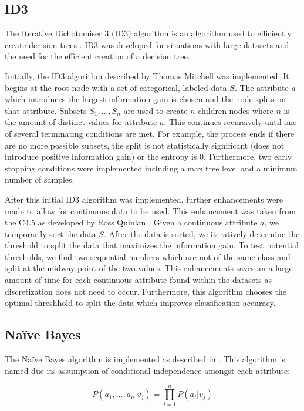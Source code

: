 \documentclass[11pt]{article}
\begin{document}
\subsection{ID3}
The Iterative Dichotomiser 3 (ID3) algorithm is an algorithm used to efficiently create decision trees \cite{Quinlan:1986:IDT:637962.637969}. ID3 was developed for situations with large datasets and the need for the efficient creation of a decision tree.

Initially, the ID3 algorithm described by Thomas Mitchell \cite{Mitchell:1997:ML:541177} was implemented. It begins at the root node with a set of categorical, labeled data $S$. The attribute $a$ which introduces the largest information gain is chosen and the node splits on that attribute. Subsets ${S_1,...,S_n}$ are used to create $n$ children nodes where $n$ is the amount of distinct values for attribute $a$. This continues recursively until one of several terminating conditions are met. For example, the process ends if there are no more possible subsets, the split is not statistically significant (does not introduce positive information gain) or the entropy is $0$. Furthermore, two early stopping conditions were implemented including a max tree level and a minimum number of samples.

After this initial ID3 algorithm was implemented, further enhancements were made to allow for continuous data to be used. This enhancement was taken from the C4.5 as developed by Ross Quinlan \citep{c45algorithm}. Given a continuous attribute $a$, we temporarily sort the data $S$. After the data is sorted, we iteratively determine the threshold to split the data that maximizes the information gain. To test potential thresholds, we find two sequential numbers which are not of the same class and split at the midway point of the two values. This enhancements saves an a large amount of time for each continuous attribute found within the datasets as discretization does not need to occur. Furthermore, this algorithm chooses the optimal threshhold to split the data which improves classification accuracy.

\subsection{Naïve Bayes}
The Naïve Bayes algorithm is implemented as described in \cite{Mitchell:1997:ML:541177}. This algorithm is named due its assumption of conditional independence amongst each attribute:

$$P(a_1,...,a_n|v_j) = \prod_{i=1}^{n}P(a_i|v_j)$$
\end{document}
